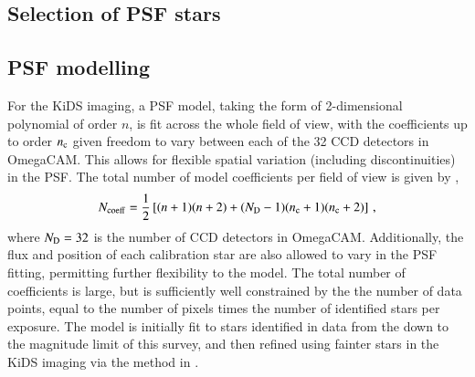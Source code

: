 \documentclass{aa}
\begin{document}
	\subsection{Selection of PSF stars}
	
	\subsection{PSF modelling}
	
	
	
	For the KiDS imaging, a PSF model, taking the form of 2-dimensional polynomial of order $n$, is fit across the whole field of view, with the coefficients up to order $n_{\rm c}$ given freedom to vary between each of the 32 CCD detectors in OmegaCAM.  This allows for flexible spatial variation (including discontinuities) in the PSF. The total number of model coefficients per field of view is given by \citep{Kuijken_etal_2015},
	\begin{equation}
	N_{\rm coeff} = \frac{1}{2} \left[ (n+1)(n+2) + (N_{\rm D}-1)(n_{\rm c} +1)(n_{\rm c}+2) \right] \,,
	\label{eqn:PSFModel_KiDS}
	\end{equation}
	where $N_{\rm D}=32$ is the number of CCD detectors in OmegaCAM. Additionally, the flux and position of each calibration star are also allowed to vary in the PSF fitting, permitting further flexibility to the model. The total number of coefficients is large, but is sufficiently well constrained by the the number of data points, equal to the number of pixels times the number of identified stars per exposure. The model is initially fit to stars identified in data from the \cite{Gaia_etal_2018} down to the magnitude limit of this survey, and then refined using fainter stars in the KiDS imaging via the method in \cite{Kuijken_etal_2019}.   
	
\end{document}
